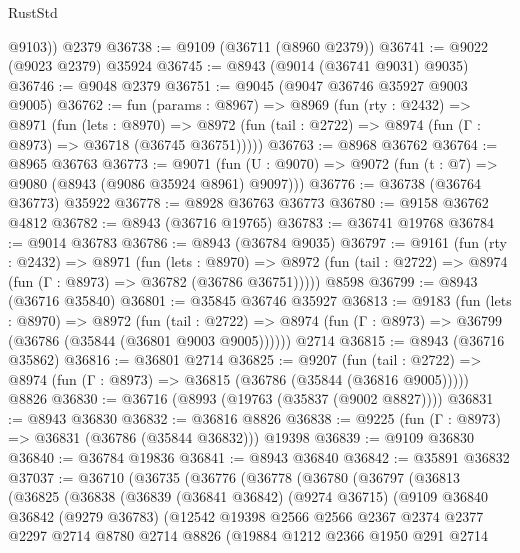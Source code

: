 \begin{lexlean}{RustStd}
\begin{coremodule}
{\begin{coremodule}
{{{{{{{{{{{{{{{{{{{{{{{{{{{{{{{{{{{{{{{        @9103))
    @2379
@36738 := @9109 (@36711 (@8960 @2379))
@36741 := @9022 (@9023 @2379) @35924
@36745 := @8943 (@9014 (@36741 @9031) @9035)
@36746 := @9048 @2379
@36751 := @9045 (@9047 @36746 @35927 @9003 @9005)
@36762 := fun (params : @8967) =>
  @8969
    (fun (rty : @2432) =>
    @8971
      (fun (lets : @8970) =>
      @8972 (fun (tail : @2722) => @8974 (fun (Γ : @8973) => @36718 (@36745 @36751)))))
@36763 := @8968 @36762
@36764 := @8965 @36763
@36773 := @9071
    (fun (U : @9070) => @9072 (fun (t : @7) => @9080 (@8943 (@9086 @35924 @8961) @9097)))
@36776 := @36738 (@36764 @36773) @35922
@36778 := @8928 @36763 @36773
@36780 := @9158 @36762 @4812
@36782 := @8943 (@36716 @19765)
@36783 := @36741 @19768
@36784 := @9014 @36783
@36786 := @8943 (@36784 @9035)
@36797 := @9161
    (fun (rty : @2432) =>
    @8971
      (fun (lets : @8970) =>
      @8972 (fun (tail : @2722) => @8974 (fun (Γ : @8973) => @36782 (@36786 @36751)))))
    @8598
@36799 := @8943 (@36716 @35840)
@36801 := @35845 @36746 @35927
@36813 := @9183
    (fun (lets : @8970) =>
    @8972
      (fun (tail : @2722) =>
      @8974 (fun (Γ : @8973) => @36799 (@36786 (@35844 (@36801 @9003 @9005))))))
    @2714
@36815 := @8943 (@36716 @35862)
@36816 := @36801 @2714
@36825 := @9207
    (fun (tail : @2722) => @8974 (fun (Γ : @8973) => @36815 (@36786 (@35844 (@36816 @9005)))))
    @8826
@36830 := @36716 (@8993 (@19763 (@35837 (@9002 @8827))))
@36831 := @8943 @36830
@36832 := @36816 @8826
@36838 := @9225 (fun (Γ : @8973) => @36831 (@36786 (@35844 @36832))) @19398
@36839 := @9109 @36830
@36840 := @36784 @19836
@36841 := @8943 @36840
@36842 := @35891 @36832
@37037 := @36710
    (@36735
      (@36776
        (@36778
          (@36780
            (@36797
              (@36813
                (@36825
                  (@36838
                    (@36839
                      (@36841 @36842)
                      (@9274 @36715)
                      (@9109
                        @36840
                        @36842
                        (@9279 @36783)
                        (@12542
                          @19398
                          @2566
                          @2566
                          @2367
                          @2374
                          @2377
                          @2297
                          @2714
                          @8780
                          @2714
                          @8826
                          (@19884
                            @1212
                            @2366
                            @1950
                            @291
                            @2714
}}}}}}}}}}}}}}}}}}}}}}}}}}}}}}}}}}}}}}}
\end{coremodule}}
\end{coremodule}
\end{lexlean}
